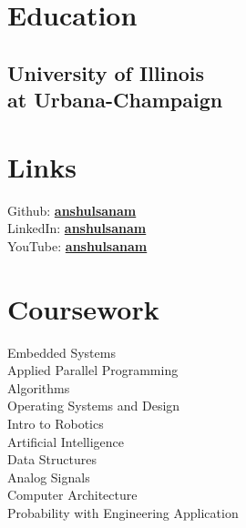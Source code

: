 \documentclass[]{deedy-resume-openfont}
\begin{document}
%
%
\lastupdated

%
%

%
%

\begin{minipage}[t]{0.33\textwidth} 


\section{Education} 

\subsection{University of Illinois \\ at Urbana-Champaign}
\sectionsep


\section{Links} 
Github: \href{https://github.com/anshulsanam}{\bf anshulsanam} \\
LinkedIn:  \href{https://www.linkedin.com/in/anshulsanam/}{\bf anshulsanam} \\
YouTube:  \href{https://www.youtube.com/user/anshulsanam}{\bf anshulsanam} \\


\section{Coursework}
Embedded Systems \\
Applied Parallel Programming \\
Algorithms \\
Operating Systems and Design\\
Intro to Robotics \\
Artificial Intelligence \\
Data Structures \\
Analog Signals \\
Computer Architecture \\
Probability with Engineering Application \\


\end{minipage}
\end{document}

